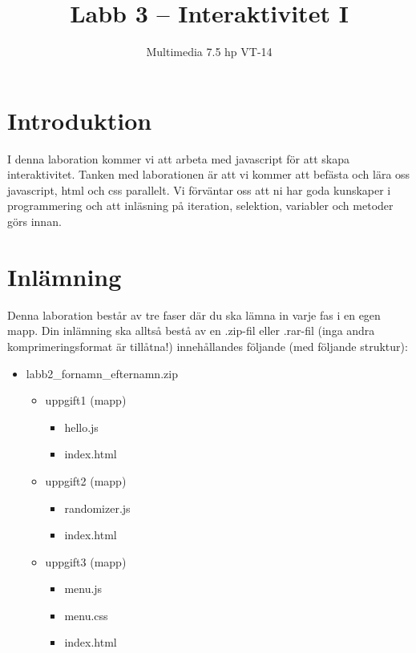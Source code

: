 \documentclass[12pt]{article}
\date{}
\title{ Labb 3 -- Interaktivitet I }
\author{ Multimedia 7.5 hp VT-14 }
\begin{document}
\maketitle
\vspace{-2em}



\section{Introduktion}
I denna laboration kommer vi att arbeta med javascript för att skapa interaktivitet. Tanken med laborationen är att vi kommer att befästa och lära oss javascript, html och css parallelt. Vi förväntar oss att ni har goda kunskaper i programmering och att inläsning på iteration, selektion, variabler och metoder görs innan. 

\section{Inlämning}
Denna laboration består av tre faser där du ska lämna in varje fas i en egen mapp. Din inlämning ska alltså bestå av en .zip-fil eller .rar-fil (inga andra komprimeringsformat är tillåtna!) innehållandes följande (med följande struktur):
  \begin{itemize}
    \item labb2\_fornamn\_efternamn.zip

      \begin{itemize}
        \item uppgift1 (mapp)
          \begin{itemize}
            \item hello.js 
            \item index.html
          \end{itemize}
        \item uppgift2 (mapp)
          \begin{itemize}
            \item randomizer.js
            \item index.html
          \end{itemize}
	      \item uppgift3 (mapp)
          \begin{itemize}
            \item menu.js
            \item menu.css
            \item index.html
          \end{itemize}
    \end{itemize}
  \end{itemize}
\end{document}
